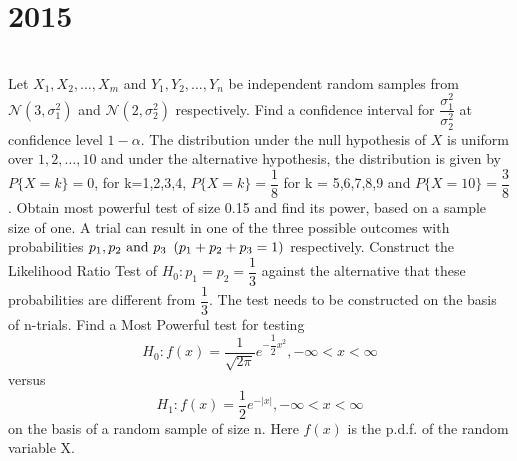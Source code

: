 \section*{2015}
\vspace{-.5cm}
\hrulefill \smallskip\\
 Let $X_1,X_2,\ldots,X_m$ and $Y_1,Y_2,\ldots,Y_n$ be independent random samples from $\mathcal{N}(3,\sigma_1^2)$ and $\mathcal{N}(2,\sigma_2^2)$ respectively. Find a confidence interval for $\dfrac{\sigma_1^2}{\sigma_2^2}$ at confidence level $1-\alpha$.
\myline
{} The distribution under the null hypothesis of $X$ is uniform over $1,2,\ldots,10$ and under the alternative hypothesis, the distribution is given by $P\{X =k\} = 0$, for k=1,2,3,4, $P\{X=k\} = \dfrac{1}{8}$ for k = 5,6,7,8,9 and $P\{X=10\} = \dfrac{3}{8}$. Obtain most powerful test of size 0.15 and find its power, based on a sample size of one.
\myline
{} A trial can result in one of the three possible outcomes with probabilities $p_1,p_2 \text{ and } p_3 \enskip(p_1+p_2+p_3 = 1)$ respectively. Construct the Likelihood Ratio Test of $H_0:p_1=p_2=\dfrac{1}{3}$ against the alternative that these probabilities are different from $\dfrac{1}{3}$. The test needs to be constructed on the basis of n-trials.
\myline
{} Find a Most Powerful test for testing \[H_0:f(x) = \dfrac{1}{\sqrt{2\pi}} e^{-\dfrac{1}{2}x^2}, -\infty < x < \infty \]
versus \[ H_1:f(x)=\dfrac{1}{2}e^{-|x|}, -\infty<x<\infty \] on the basis of a random sample of size n. Here $f(x)$ is the p.d.f. of the random variable X.